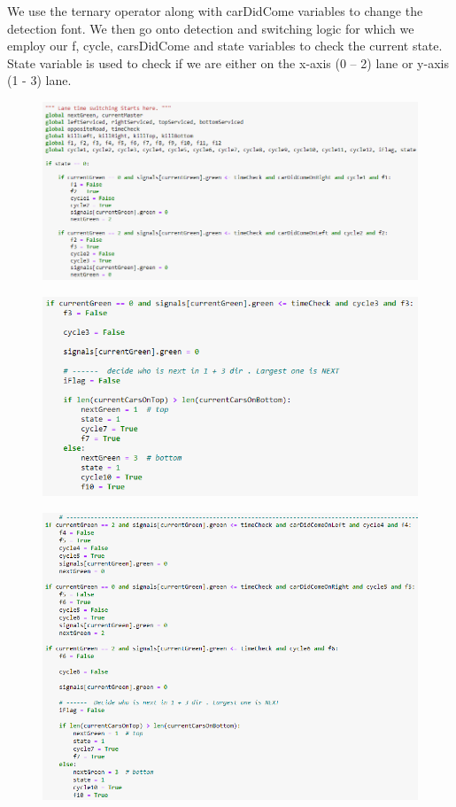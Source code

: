 \documentclass[12pt, a4paper,titlepage]{article}
\begin{document}
We use the ternary operator along with carDidCome variables to change the detection font. We then go onto detection and switching logic for which we employ our f, cycle, carsDidCome and state variables to check the current state. State variable is used to check if we are either on the x-axis (0 – 2) lane or y-axis (1 - 3) lane.

\begin{figure}[H]
	\centering
	\includegraphics[width=\linewidth]{images/a5}
	\caption{}
	\label{fig:a5}
\end{figure}

\begin{figure}[H]
	\centering
	\includegraphics[width=\linewidth]{images/a6}
	\caption{}
	\label{fig:a6}
\end{figure}

\begin{figure}[H]
	\centering
	\includegraphics[width=\linewidth]{images/a9}
	\caption{}
	\label{fig:a9}
\end{figure}
\end{document}
